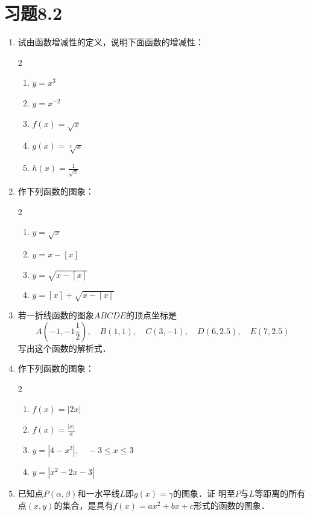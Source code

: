 \section*{习题8.2}
\begin{enumerate}
    \item 试由函数增减性的定义，说明下面函数的增减性：
    \begin{multicols}{2}
\begin{enumerate}
    \item $y=x^3$
    \item $y=x^{-2}$
    \item $f(x)=\sqrt{x}$
    \item $g(x)=\sqrt[3]{x}$
    \item $h(x)=\frac{1}{\sqrt{x}}$
\end{enumerate}        
    \end{multicols}

    \item 作下列函数的图象：
    \begin{multicols}{2}
        \begin{enumerate}   
\item $y=\sqrt{x}$
\item $y=x-[x]$
\item $y=\sqrt{x-[x]}$
\item $y=[x]+\sqrt{x-[x]}  $
        \end{enumerate}        
    \end{multicols}
    \item 若一折线函数的图象$ABCDE$的顶点坐标是
\[A\left(-1,-1\frac{1}{2}\right),\quad B(1,1),\quad C(3,-1),\quad D(6,2.5),\quad E(7,2.5)\]    
写出这个函数的解析式．

\item 作下列函数的图象：
\begin{multicols}{2}
    \begin{enumerate}  
\item $f(x)=|2x|$
\item $f(x)=\frac{|x|}{x}$
\item $y=|4-x^2|,\quad -3\le x\le 3$
\item $y=|x^2-2x-3|$
\end{enumerate}        
\end{multicols}
\item 已知点$P(\alpha,\beta)$和一水平线$L$即$g(x)=\gamma$的图象．证
明至$P$与$L$等距离的所有点$(x,y)$的集合，是具有$f(x)=
ax^2+bx+c$形式的函数的图象．
\end{enumerate}

